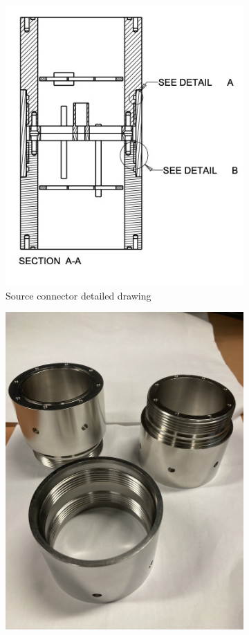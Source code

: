 \documentclass[12pt]{article}
\begin{document}
\begin{figure}
  \begin{center}
\begin{subfigure}{0.4\textwidth}
  \includegraphics[width=\textwidth]{SourceConnectorSection}
  \caption{Source connector detailed drawing}
  \label{fig:SC}
\end{subfigure}
\begin{subfigure}{0.4\textwidth}
  \includegraphics[height=\textwidth,angle=270]{IMG_5710}

\end{subfigure}
\end{center}
\end{figure}
\end{document}
